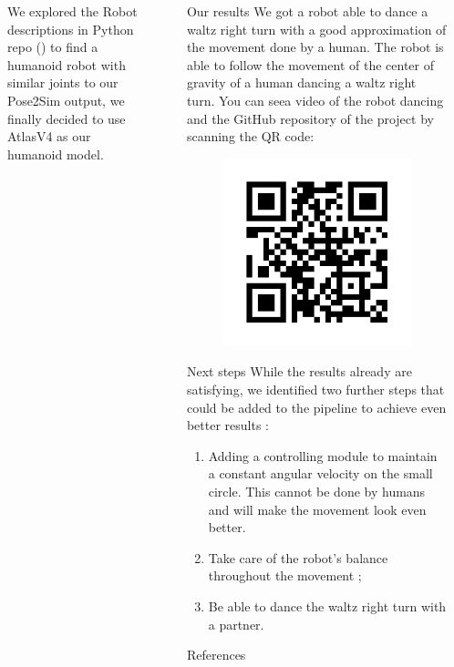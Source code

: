 \documentclass[final]{beamer}
\newlength{\sepwidth}
\newlength{\colwidth}
\newcommand{\separatorcolumn}{\begin{column}{\sepwidth}\end{column}}
\begin{document}
\begin{frame}[t]
\begin{columns}[t]
\begin{column}{\colwidth}
We explored the Robot descriptions in Python repo (\cite{robot_descriptions_py}) to find a humanoid robot with similar joints to our Pose2Sim output, we finally decided to use AtlasV4 as our humanoid model.
  \end{column}
\separatorcolumn
\begin{column}{\colwidth}
  
  \begin{alertblock}{Our results}
    We got a robot able to dance a waltz right turn with a good approximation of the movement done by a human. 
    The robot is able to follow the movement of the center of gravity of a human dancing a waltz right turn. 
    You can seea video of the robot dancing and the GitHub repository of the project by scanning the QR code:
    \begin{figure}
      \centering
      \includegraphics[width = 0.7 \columnwidth]{img/qr_code.png}
    \end{figure}
  \end{alertblock}

  \begin{block}{Next steps}
While the results already are satisfying, we identified two further steps that could be added to the pipeline to achieve even better results :
\begin{enumerate}
    \item Adding a controlling module to maintain a constant angular velocity on the small circle. This cannot be done by humans and will make the movement look even better.
    \item Take care of the robot's balance throughout the movement ;
    \item Be able to dance the waltz right turn with a partner.
\end{enumerate}
  \end{block}
  \begin{block}{References}
 \footnotesize{\printbibliography}
 
  \end{block}
\end{column}
\separatorcolumn
\end{columns}
\end{frame}
\end{document}

